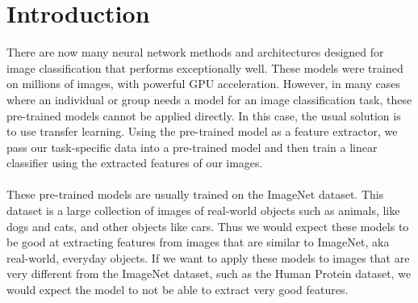 \documentclass{article}
\begin{document}
\section{Introduction}
There are now many neural network methods and architectures designed for image classification that performs exceptionally well. These models were trained
on millions of images, with powerful GPU acceleration. However, in many cases where an individual or group needs a model for an image classification task, these pre-trained models cannot be applied directly. In this case, the usual solution is to use transfer learning. Using the pre-trained model as a feature extractor, we pass our task-specific data into a pre-trained model and then train a linear classifier using the extracted features of our images.
\\
\\
These pre-trained models are usually trained on the ImageNet dataset\cite{imagenet_cvpr09}. This dataset is a large
collection of images of real-world objects such as animals, like dogs and cats, and other objects like cars.
Thus we would expect these models to be good at extracting features from images that are similar to ImageNet,
aka real-world, everyday objects. If we want to apply these models to images that are very different from the ImageNet dataset, such as the Human Protein dataset, we would expect the model to not be able to extract very good features.
\end{document}
